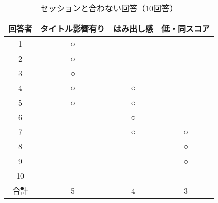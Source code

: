 \begin{table}
\begin{center}
\caption[表]{\label{awanai}セッションと合わない回答（10回答）}
\footnotesize 
\begin{tabular}{|c|c|c|c|}\hline
回答者 & タイトル影響有り & はみ出し感 & 低・同スコア\\\hline
 1 & ○ & & \\\hline
 2 & ○ & & \\\hline
 3 & ○ & & \\\hline
 4 & ○ & ○ & \\\hline
 5 & ○ & ○ & \\\hline
 6 &  & ○ & \\\hline
 7 &  & ○ & ○ \\\hline
 8 &  &  & ○ \\\hline
 9 &  &  & ○ \\\hline
 10 &  &  & \\\hline
 合計 & 5 & 4 & 3 \\\hline
\end{tabular}
\end{center}
\end{table}
